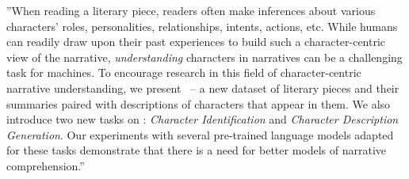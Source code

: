 ''When reading a literary piece, readers often make inferences about various characters' roles, personalities, relationships, intents, actions, etc. While humans can readily draw upon their past experiences to build such a character-centric view of the narrative, \textit{understanding} characters in narratives can be a challenging task for machines. To encourage research in this field of character-centric narrative understanding, we present \fiscu \ -- a new dataset of literary pieces and their summaries paired with descriptions of characters that appear in them. We also introduce two new tasks on \fiscu: \textit{Character Identification} and \textit{Character Description Generation}. Our experiments with several pre-trained language models adapted for these tasks demonstrate that there is a need for better models of narrative comprehension.''
